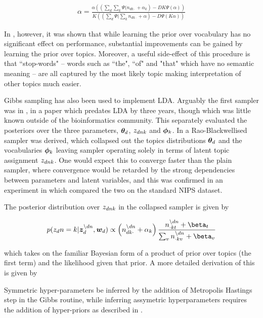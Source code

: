 \begin{align}
\alpha = \frac{\alpha \left( \left(\sum_d \sum_k \Psi(n_{dk\cdot} + \alpha_k \right) - DK \Psi (\alpha)\right)}{K \left( \left(\sum_d  \Psi(\sum_k n_{dk\cdot} + \alpha \right) - D \Psi (K \alpha)\right)}
\end{align}

In \cite{Wallach2009a}, however, it was shown that while learning the prior over vocabulary has no significant effect on performance, substantial improvements can be gained by learning the prior over topics. Moreover, a useful side-effect of this procedure is that ``stop-words" -- words such as ``the", ``of" and "that" which have no semantic meaning -- are all captured by the most likely topic making interpretation of other topics much easier.

Gibbs sampling has also been used to implement LDA. Arguably the first sampler was in \cite{Pritchard2000}, in a paper which predates LDA by three years, though which was little known outside of the bioinformatics community. This separately evaluated the posteriors over the three parameters, ${ \bm \theta_d }$, ${ z_{dnk} }$ and ${ \bm \phi_k }$. In\cite{Griffiths2004} a Rao-Blackwellised sampler was derived, which collapsed out the topics distributions ${ \bm \theta_d }$ and the vocabularies ${ \bm \phi_k }$ leaving sampler operating solely in terms of latent topic assignment ${ z_{dnk} }$. One would expect this to converge faster than the plain sampler, where convergence would be retarded by the strong dependencies between parameters and latent variables\cite{CasellaRobert1999}, and this was confirmed in an experiment in \cite{Newman2009} which compared the two on the standard NIPS dataset.

The posterior distribution over ${ z_{dnk} }$ in the collapsed sampler is given by

\begin{align}
p(z_dn = k | \vv{z}_{d}^{\setminus dn}, \vv{w}_d)
\propto
\left(n_{dk\cdot}^{\setminus dn} + \alpha_k \right)
\frac{n_{\cdot kt}^{\setminus dn} + \beta_t}{\sum_v n_{\cdot kv}^{\setminus dn} + \beta_v}
\end{align}

which takes on the familiar Bayesian form of a product of prior over topics (the first term) and the likelihood given that prior. A more detailed derivation of this is given by \cite{Heinrich2005}

Symmetric hyper-parameters be inferred by the addition of Metropolis Hastings step in the Gibbs routine, while inferring assymetric hyperparameters requires the addition of hyper-priors as described in \cite{Wallach2009a}. 

